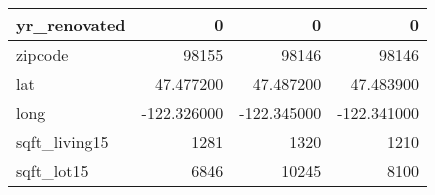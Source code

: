 \begin{table}[H]
\begin{tabular}{|l|r|r|r|}
\hline yr\_renovated & \cellcolor[rgb]{0.9, 0.54, 0.52} 0 & \cellcolor[rgb]{0.9, 0.54, 0.52} 0 & \cellcolor[rgb]{0.9, 0.54, 0.52} 0 \\
\hline zipcode & \cellcolor[rgb]{0.9, 0.54, 0.52} 98155 & 98146 & 98146 \\
\hline lat & \cellcolor[rgb]{0.9, 0.54, 0.52} 47.477200 & 47.487200 & 47.483900 \\
\hline long & \cellcolor[rgb]{0.9, 0.54, 0.52} -122.326000 & \cellcolor[rgb]{0.9, 0.54, 0.52} -122.345000 & \cellcolor[rgb]{0.9, 0.54, 0.52} -122.341000 \\
\hline sqft\_living15 & \cellcolor[rgb]{0.9, 0.54, 0.52} 1281 & 1320 & 1210 \\
\hline sqft\_lot15 & \cellcolor[rgb]{0.9, 0.54, 0.52} 6846 & 10245 & 8100 \\
\hline
\end{tabular}
\end{table}
